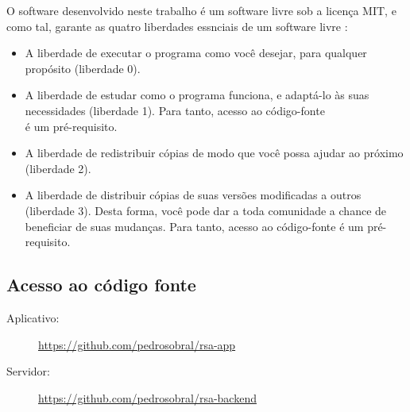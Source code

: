 O software desenvolvido neste trabalho é um software livre sob a licença MIT,
e como tal, garante as quatro liberdades essnciais de um software livre \cite{freesoftware}:
\begin{citacao}
  \begin{minipage}{11cm}
  \begin{itemize}
      \item A liberdade de executar o programa como você desejar, para qualquer propósito (liberdade 0).
      \item A liberdade de estudar como o programa funciona, e adaptá-lo às suas necessidades (liberdade 1). Para tanto, acesso ao código-fonte\\ é um pré-requisito.
      \item A liberdade de redistribuir cópias de modo que você possa ajudar ao próximo (liberdade 2).
      \item A liberdade de distribuir cópias de suas versões modificadas a outros (liberdade 3). Desta forma, você pode dar a toda comunidade a chance de beneficiar de suas mudanças. Para tanto, acesso ao código-fonte é um pré-requisito.
  \end{itemize}
  \end{minipage}
\end{citacao}

\subsection{Acesso ao código fonte}

\begin{description}
  \item [Aplicativo:] \href{https://github.com/pedrosobral/rsa-app}{https://github.com/pedrosobral/rsa-app}
  \item [Servidor:] \href{https://github.com/pedrosobral/rsa-backend}{https://github.com/pedrosobral/rsa-backend}
\end{description}
